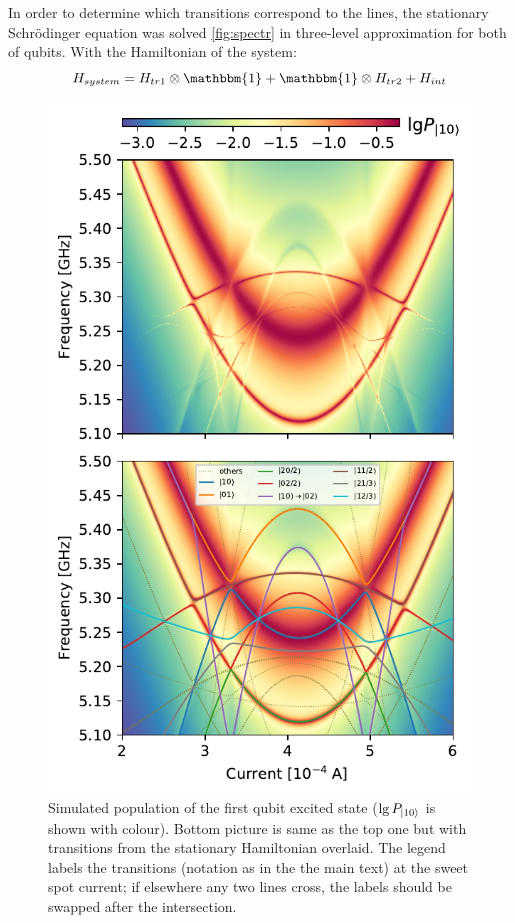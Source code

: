 \documentclass[%
 aip,
 amsmath,amssymb,
 reprint,%
]{revtex4-1}
\begin{document}
In order to determine which transitions correspond to the lines, the stationary Schrödinger equation was solved \autoref{fig:spectr} in three-level approximation for both of qubits. With the Hamiltonian of the system:
\begin{equation}
	H_{system} = H_{tr1}\otimes \mathbbm{1}+\mathbbm{1}\otimes H_{tr2}+H_{int}
\end{equation}
\begin{figure}[h]
	\centering
	\includegraphics[width=\linewidth]{stationary}
	\caption{Simulated population of the first qubit excited state ($\lg P_{\ket{10}}$ is shown with colour). Bottom picture is same as the top one but with transitions from the stationary Hamiltonian overlaid. The legend labels the transitions (notation as in the the main text) at the sweet spot current; if elsewhere any two lines cross, the labels should be swapped after the intersection.}
	\label{fig:statinary_levels}
\end{figure}
\end{document}
